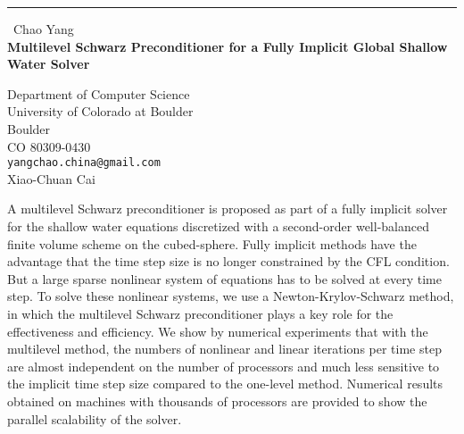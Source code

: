 \documentclass{report}
\begin{document}
\begin{center}
\rule{6in}{1pt} \
{\large Chao Yang \\
{\bf Multilevel Schwarz Preconditioner for a Fully Implicit Global Shallow Water Solver}}

Department of Computer Science \\ University of Colorado at Boulder \\ Boulder \\ CO 80309-0430
\\
{\tt yangchao.china@gmail.com}\\
Xiao-Chuan Cai\end{center}

A multilevel Schwarz preconditioner is proposed as part of a fully
implicit solver for the shallow water equations discretized with a
second-order well-balanced finite volume scheme on the cubed-sphere.
Fully implicit methods have the advantage that the time step size is no
longer constrained by the CFL condition. But a large sparse nonlinear
system of equations has to be solved at every time step. To solve these
nonlinear systems, we use a Newton-Krylov-Schwarz method, in which the
multilevel Schwarz preconditioner plays a key role for the effectiveness
and efficiency. We show by numerical experiments that with the multilevel
method, the numbers of nonlinear and linear iterations per time step are
almost independent on the number of processors and much less sensitive to
the implicit time step size compared to the one-level method. Numerical
results obtained on machines with thousands of processors are provided to
show the parallel scalability of the solver.
\end{document}
